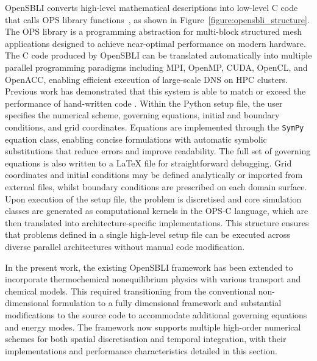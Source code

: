 OpenSBLI converts high-level mathematical descriptions into low-level C code that calls \gls{OPS} library functions~\citep{RegulyMudaligeGiles2018}, as shown in Figure~\ref{figure:opensbli_structure}. The \gls{OPS} library is a programming abstraction for multi-block structured mesh applications designed to achieve near-optimal performance on modern hardware. The C code produced by OpenSBLI can be translated automatically into multiple parallel programming paradigms including MPI, OpenMP, CUDA, OpenCL, and OpenACC, enabling efficient execution of large-scale \gls{DNS} on HPC clusters. Previous work has demonstrated that this system is able to match or exceed the performance of hand-written code \citep{MudaligeEtAl2019}. Within the Python setup file, the user specifies the numerical scheme, governing equations, initial and boundary conditions, and grid coordinates. Equations are implemented through the \texttt{SymPy} equation class, enabling concise formulations with automatic symbolic substitutions that reduce errors and improve readability. The full set of governing equations is also written to a LaTeX file for straightforward debugging. Grid coordinates and initial conditions may be defined analytically or imported from external files, whilst boundary conditions are prescribed on each domain surface. Upon execution of the setup file, the problem is discretised and core simulation classes are generated as computational kernels in the \gls{OPS}-C language, which are then translated into architecture-specific implementations. This structure ensures that problems defined in a single high-level setup file can be executed across diverse parallel architectures without manual code modification.

In the present work, the existing OpenSBLI framework has been extended to incorporate thermochemical nonequilibrium physics with various transport and chemical models. This required transitioning from the conventional non-dimensional formulation to a fully dimensional framework and substantial modifications to the source code to accommodate additional governing equations and energy modes. The framework now supports multiple high-order numerical schemes for both spatial discretisation and temporal integration, with their implementations and performance characteristics detailed in this section.

